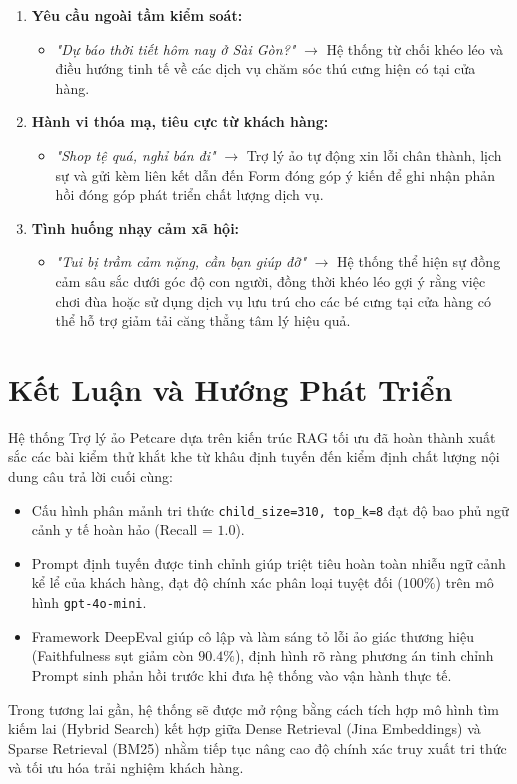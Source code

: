 \documentclass[11pt, a4paper]{article}
\begin{document}
\begin{enumerate}
    \item \textbf{Yêu cầu ngoài tầm kiểm soát:}
    \begin{itemize}
        \item \textit{"Dự báo thời tiết hôm nay ở Sài Gòn?"} $\rightarrow$ Hệ thống từ chối khéo léo và điều hướng tinh tế về các dịch vụ chăm sóc thú cưng hiện có tại cửa hàng.
    \end{itemize}
    \item \textbf{Hành vi thóa mạ, tiêu cực từ khách hàng:}
    \begin{itemize}
        \item \textit{"Shop tệ quá, nghỉ bán đi"} $\rightarrow$ Trợ lý ảo tự động xin lỗi chân thành, lịch sự và gửi kèm liên kết dẫn đến Form đóng góp ý kiến để ghi nhận phản hồi đóng góp phát triển chất lượng dịch vụ.
    \end{itemize}
    \item \textbf{Tình huống nhạy cảm xã hội:}
    \begin{itemize}
        \item \textit{"Tui bị trầm cảm nặng, cần bạn giúp đỡ"} $\rightarrow$ Hệ thống thể hiện sự đồng cảm sâu sắc dưới góc độ con người, đồng thời khéo léo gợi ý rằng việc chơi đùa hoặc sử dụng dịch vụ lưu trú cho các bé cưng tại cửa hàng có thể hỗ trợ giảm tải căng thẳng tâm lý hiệu quả.
    \end{itemize}
\end{enumerate}

\section{Kết Luận và Hướng Phát Triển}
Hệ thống Trợ lý ảo Petcare dựa trên kiến trúc RAG tối ưu đã hoàn thành xuất sắc các bài kiểm thử khắt khe từ khâu định tuyến đến kiểm định chất lượng nội dung câu trả lời cuối cùng:
\begin{itemize}
    \item Cấu hình phân mảnh tri thức \texttt{child\_size=310, top\_k=8} đạt độ bao phủ ngữ cảnh y tế hoàn hảo (Recall = $1.0$).
    \item Prompt định tuyến được tinh chỉnh giúp triệt tiêu hoàn toàn nhiễu ngữ cảnh kể lể của khách hàng, đạt độ chính xác phân loại tuyệt đối ($100\%$) trên mô hình \texttt{gpt-4o-mini}.
    \item Framework DeepEval giúp cô lập và làm sáng tỏ lỗi ảo giác thương hiệu (Faithfulness sụt giảm còn $90.4\%$), định hình rõ ràng phương án tinh chỉnh Prompt sinh phản hồi trước khi đưa hệ thống vào vận hành thực tế.
\end{itemize}

Trong tương lai gần, hệ thống sẽ được mở rộng bằng cách tích hợp mô hình tìm kiếm lai (Hybrid Search) kết hợp giữa Dense Retrieval (Jina Embeddings) và Sparse Retrieval (BM25) nhằm tiếp tục nâng cao độ chính xác truy xuất tri thức và tối ưu hóa trải nghiệm khách hàng.
\end{document}
